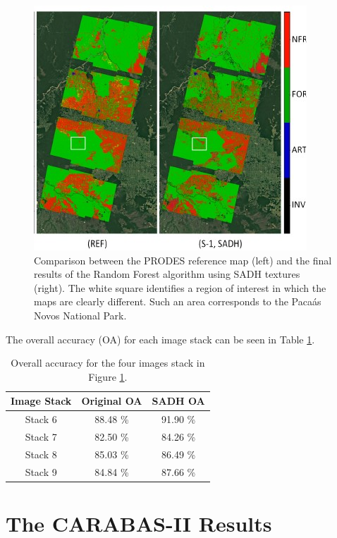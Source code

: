 \begin{figure}
    \centering
    \includegraphics{Cap3-Results/sentinel1-classificationresults.jpg}
    \caption{Comparison between the PRODES reference map (left) and the final results of the Random Forest algorithm using SADH textures (right). The white square identifies a region of interest in which the maps are clearly different.
    Such an area corresponds to the Pacaás Novos National Park.}
    \label{img:sentinel_results}
\end{figure}

The overall accuracy (OA) for each image stack can be seen in Table \ref{tab:sentinel_table_results}.

\begin{table}[H]
    \centering
    \begin{tabular}{ |c |c | c|}
     \hline
        Image Stack & Original OA & SADH OA\\ \hline \hline
        Stack 6 & 88.48 \% & 91.90 \% \\ \hline
        Stack 7 & 82.50 \% & 84.26 \% \\ \hline
        Stack 8 & 85.03 \% & 86.49 \% \\ \hline
        Stack 9 & 84.84 \% & 87.66 \% \\  \hline
    \end{tabular}
    \caption{Overall accuracy for the four images stack in Figure \ref{img:sentinel_results}.}
    \label{tab:sentinel_table_results}
\end{table}

\section{The CARABAS-II Results}

